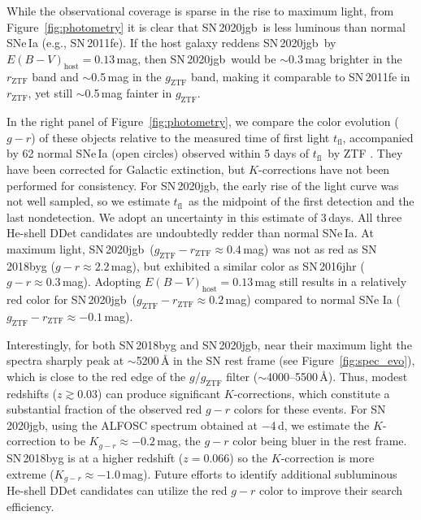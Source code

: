 \documentclass[twocolumn]{aastex631}
\newcommand{\sn}{SN\,2020jgb}
\newcommand{\tfl}{$t_\mathrm{fl}$}
\begin{document}
While the observational coverage is sparse in the rise to maximum light, from Figure~\ref{fig:photometry} it is clear that \sn\ is less luminous than normal SNe\,Ia (e.g., SN\,2011fe). If the host galaxy reddens \sn\ by $E(B-V)_\mathrm{host} = 0.13$\,mag, then \sn\ would be $\sim$0.3\,mag brighter in the $r_\mathrm{ZTF}$ band and $\sim$0.5\,mag in the $g_\mathrm{ZTF}$ band, making it comparable to SN\,2011fe in $r_\mathrm{ZTF}$, yet still $\sim$0.5\,mag fainter in $g_\mathrm{ZTF}$. %

In the right panel of Figure~\ref{fig:photometry}, we compare the color evolution ($g-r$) of these objects relative to the measured time of first light \tfl, accompanied by 62 normal SNe\,Ia (open circles) observed within 5 days of \tfl\ by ZTF \citep[from][]{Bulla2020}. They have been corrected for Galactic extinction, but $K$-corrections have not been performed for consistency. For \sn, the early rise of the light curve was not well sampled, so we estimate \tfl\ as the midpoint of the first detection and the last nondetection. We adopt an uncertainty in this estimate of 3\,days. All three He-shell DDet candidates are undoubtedly redder than normal SNe\,Ia. At maximum light, \sn\ ($g_\mathrm{ZTF}-r_\mathrm{ZTF}\approx0.4$\,mag) was not as red as SN\,2018byg ($g-r\approx2.2$\,mag), but exhibited a similar color as SN\,2016jhr ($g-r\approx0.3$\,mag). Adopting $E(B-V)_\mathrm{host} = 0.13$\,mag still results in a relatively red color for \sn\ ($g_\mathrm{ZTF}-r_\mathrm{ZTF}\approx0.2$\,mag) compared to normal SNe Ia ($g_\mathrm{ZTF}-r_\mathrm{ZTF}\approx-0.1$\,mag).

Interestingly, for both SN\,2018byg and \sn, near their maximum light the spectra sharply peak at $\sim$5200\,\r{A} in the SN rest frame (see Figure~\ref{fig:spec_evo}), which is close to the red edge of the $g$/$g_\mathrm{ZTF}$ filter ($\sim$4000--5500\,\r{A}). Thus, modest redshifts ($z\gtrsim0.03$) can produce significant $K$-corrections, which constitute a substantial fraction of the observed red $g-r$ colors for these events. For \sn, using the ALFOSC spectrum obtained at $-$4\,d, we estimate the $K$-correction to be $K_{g-r}\approx -0.2$\,mag, the $g-r$ color being bluer in the rest frame. SN\,2018byg is at a higher redshift ($z=0.066$) so the $K$-correction is more extreme ($K_{g-r}\approx-1.0$\,mag). Future efforts to identify additional subluminous He-shell DDet candidates can utilize the red $g-r$ color to improve their search efficiency.
\end{document}
